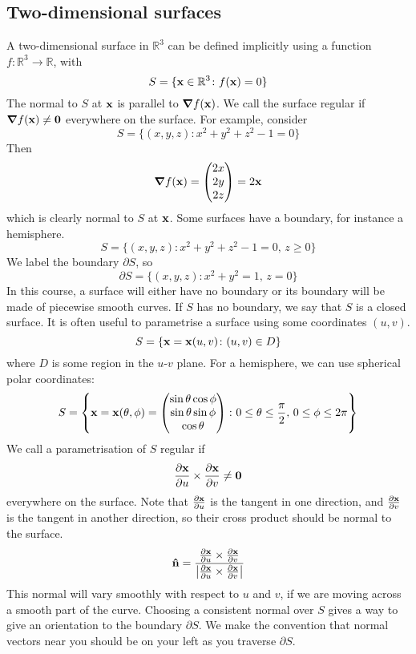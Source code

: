\subsection{Two-dimensional surfaces}
A two-dimensional surface in \(\mathbb R^3\) can be defined implicitly using a function \(f \colon \mathbb R^3 \to \mathbb R\), with
\[
	S = \{ \vb x \in \mathbb R^3 \colon f(\vb x) = 0 \}
\]
The normal to \(S\) at \(\vb x\) is parallel to \(\grad f(\vb x)\).
We call the surface regular if \(\grad f(\vb x) \neq \vb 0\) everywhere on the surface.
For example, consider
\[
	S = \{ (x, y, z) \colon x^2 + y^2 + z^2 - 1 = 0 \}
\]
Then
\[
	\grad f(\vb x) = \begin{pmatrix}
		2x \\ 2y \\ 2z
	\end{pmatrix} = 2\vb x
\]
which is clearly normal to \(S\) at \(\vb x\).
Some surfaces have a boundary, for instance a hemisphere.
\[
	S = \{ (x, y, z) \colon x^2 + y^2 + z^2 - 1 = 0,\,z \geq 0 \}
\]
We label the boundary \(\partial S\), so
\[
	\partial S = \{ (x, y, z) \colon x^2 + y^2 = 1,\,z = 0 \}
\]
In this course, a surface will either have no boundary or its boundary will be made of piecewise smooth curves.
If \(S\) has no boundary, we say that \(S\) is a closed surface.
It is often useful to parametrise a surface using some coordinates \((u, v)\).
\[
	S = \{ \vb x = \vb x(u, v) \colon (u, v) \in D \}
\]
where \(D\) is some region in the \(u\)-\(v\) plane.
For a hemisphere, we can use spherical polar coordinates:
\[
	S = \left\{ \vb x = \vb x(\theta, \phi) = \begin{pmatrix}
		\sin\theta \cos\phi \\ \sin\theta \sin\phi \\ \cos\theta
	\end{pmatrix} \colon 0 \leq \theta \leq \frac{\pi}{2},\, 0 \leq \phi \leq 2\pi \right\}
\]
We call a parametrisation of \(S\) regular if
\[
	\frac{\partial \vb x}{\partial u} \times \frac{\partial \vb x}{\partial v} \neq \vb 0
\]
everywhere on the surface.
Note that \(\frac{\partial \vb x}{\partial u}\) is the tangent in one direction, and \(\frac{\partial \vb x}{\partial v}\) is the tangent in another direction, so their cross product should be normal to the surface.
\[
	\vu{n} = \frac{\frac{\partial \vb x}{\partial u} \times \frac{\partial \vb x}{\partial v}}{\abs{\frac{\partial \vb x}{\partial u} \times \frac{\partial \vb x}{\partial v}}}
\]
This normal will vary smoothly with respect to \(u\) and \(v\), if we are moving across a smooth part of the curve.
Choosing a consistent normal over \(S\) gives a way to give an orientation to the boundary \(\partial S\).
We make the convention that normal vectors near you should be on your left as you traverse \(\partial S\).


